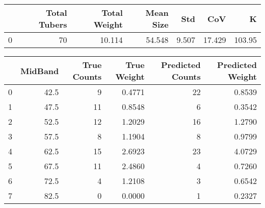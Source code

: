 \begin{tabular}{lrrrrrr}
\toprule
{} &  Total Tubers &  Total Weight &  Mean Size &    Std &     CoV &       K \\
\midrule
0 &            70 &        10.114 &     54.548 &  9.507 &  17.429 &  103.95 \\
\bottomrule
\end{tabular}

\begin{tabular}{lrrrrr}
\toprule
{} &  MidBand &  True Counts &  True Weight &  Predicted Counts &  Predicted Weight \\
\midrule
0 &     42.5 &            9 &       0.4771 &                22 &            0.8539 \\
1 &     47.5 &           11 &       0.8548 &                 6 &            0.3542 \\
2 &     52.5 &           12 &       1.2029 &                16 &            1.2790 \\
3 &     57.5 &            8 &       1.1904 &                 8 &            0.9799 \\
4 &     62.5 &           15 &       2.6923 &                23 &            4.0729 \\
5 &     67.5 &           11 &       2.4860 &                 4 &            0.7260 \\
6 &     72.5 &            4 &       1.2108 &                 3 &            0.6542 \\
7 &     82.5 &            0 &       0.0000 &                 1 &            0.2327 \\
\bottomrule
\end{tabular}

